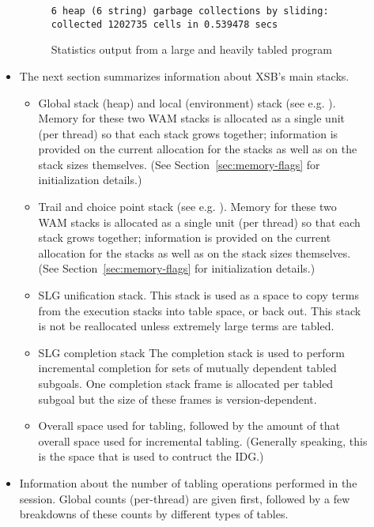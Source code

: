 \begin{description}
\begin{itemize}
\begin{figure}[p]
{\begin{verbatim}
6 heap (6 string) garbage collections by sliding: collected 1202735 cells in 0.539478 secs

\end{verbatim}} 
\caption{Statistics output from a large and heavily tabled program}
\end{figure}

\item The next section summarizes information about XSB's main stacks.

\begin{itemize} 
\item Global stack (heap) and local (environment) stack (see e.g.
  \cite{AitK90}).
  Memory for these two WAM stacks is
  allocated as a single unit (per thread) so that each stack grows
  together; information is provided on the current allocation for the
  stacks as well as on the stack sizes themselves.  (See
  Section~\ref{sec:memory-flags} for initialization details.)
%
\item Trail and choice point stack (see e.g. \cite{AitK90}).
 Memory for these two WAM stacks is allocated as a
 single unit (per thread) so that each stack grows together;
 information is provided on the current allocation for the stacks as
 well as on the stack sizes themselves.  (See
 Section~\ref{sec:memory-flags} for initialization details.)
%
\item SLG unification stack.
  This stack is used as a space to copy terms from the execution
  stacks into table space, or back out.  This stack is not be
  reallocated unless extremely large terms are tabled.
%
\item SLG completion stack
  The completion
  stack is used to perform incremental completion for sets of mutually
  dependent tabled subgoals.  One completion stack frame is allocated
  per tabled subgoal \cite{SaSw98} but the size of these frames is
  version-dependent.
%
\item Overall space used for tabling, followed by the amount of that
 overall space used for incremental tabling.  (Generally speaking,
 this is the space that is used to contruct the IDG.)
\end{itemize}

\item Information about the number of tabling operations performed in
  the session.
  Global counts (per-thread) are given
 first, followed by a few breakdowns of these counts by different
 types of tables.


\end{itemize}
\end{description}
